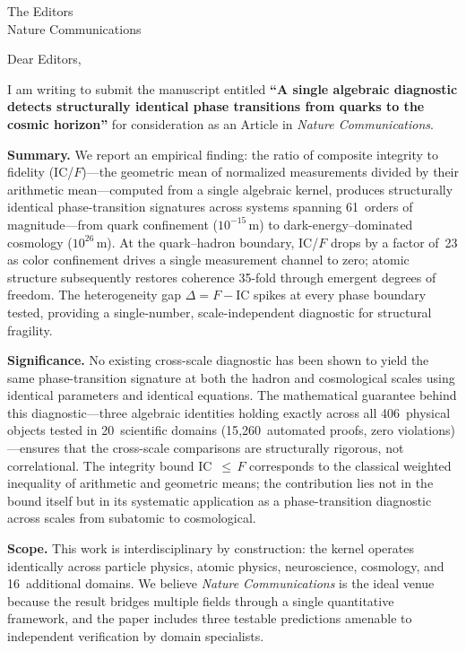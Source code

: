 \documentclass[11pt]{letter}
\begin{document}
\begin{letter}{The Editors\\Nature Communications}

\opening{Dear Editors,}

I am writing to submit the manuscript entitled \textbf{``A single
algebraic diagnostic detects structurally identical phase transitions
from quarks to the cosmic horizon''} for consideration as an Article
in \emph{Nature Communications}.

\textbf{Summary.} We report an empirical finding: the ratio of
composite integrity to fidelity (IC/$F$)---the geometric mean of
normalized measurements divided by their arithmetic mean---computed
from a single algebraic kernel, produces structurally identical
phase-transition signatures across
systems spanning 61~orders of magnitude---from quark confinement
($10^{-15}$\,m) to dark-energy--dominated cosmology ($10^{26}$\,m).
At the quark--hadron boundary, IC/$F$ drops by a factor of~23 as
color confinement drives a single measurement channel to zero;
atomic structure subsequently restores coherence 35-fold through
emergent degrees of freedom. The heterogeneity gap
$\Delta = F - \text{IC}$ spikes at every phase boundary tested,
providing a single-number, scale-independent diagnostic for
structural fragility.

\textbf{Significance.} No existing cross-scale diagnostic has been
shown to yield the same phase-transition signature at both the hadron
and cosmological scales using identical parameters and identical
equations. The mathematical guarantee behind this diagnostic---three
algebraic identities holding exactly across all 406~physical objects
tested in 20~scientific domains (15{,}260~automated proofs, zero
violations)---ensures that the cross-scale comparisons are
structurally rigorous, not correlational. The integrity bound
IC~$\leq\,F$ corresponds to the classical weighted inequality of
arithmetic and geometric means; the contribution lies not in the
bound itself but in its systematic application as a
phase-transition diagnostic across scales from subatomic to
cosmological.

\textbf{Scope.} This work is interdisciplinary by construction:
the kernel operates identically across particle physics, atomic
physics, neuroscience, cosmology, and 16~additional domains.
We believe \emph{Nature Communications} is the ideal venue because
the result bridges multiple fields through a single quantitative
framework, and the paper includes three testable predictions
amenable to independent verification by domain specialists.


\end{letter}
\end{document}
